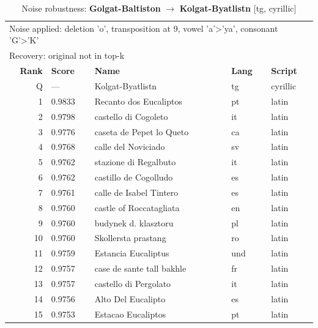 \begin{table}[htbp]
\centering
\small
\caption{Noise robustness: \textbf{Golgat-Baltiston} $\rightarrow$ \textbf{Kolgat-Byatlistn} [tg, cyrillic]}
\label{tab:noise-17}
\begin{tabular}{rllll}
\toprule
\multicolumn{5}{l}{\small Noise applied: deletion 'o', transposition at 9, vowel 'a'>'ya', consonant 'G'>'K'} \\
\multicolumn{5}{l}{\small Recovery: original not in top-k} \\
\midrule
\textbf{Rank} & \textbf{Score} & \textbf{Name} & \textbf{Lang} & \textbf{Script} \\
\midrule
\rowcolor{gray!20} Q & --- & Kolgat-Byatlistn & tg & cyrillic \\
\midrule
1 & 0.9833 & Recanto dos Eucaliptos & pt & latin \\
2 & 0.9798 & castello di Cogoleto & it & latin \\
3 & 0.9776 & caseta de Pepet lo Queto & ca & latin \\
4 & 0.9768 & calle del Noviciado & sv & latin \\
5 & 0.9762 & stazione di Regalbuto & it & latin \\
6 & 0.9762 & castillo de Cogolludo & es & latin \\
7 & 0.9761 & calle de Isabel Tintero & es & latin \\
8 & 0.9760 & castle of Roccatagliata & en & latin \\
9 & 0.9760 & budynek d. klasztoru & pl & latin \\
10 & 0.9760 & Skollersta prastang & ro & latin \\
11 & 0.9759 & Estancia Eucaliptus & und & latin \\
12 & 0.9757 & case de sante tall bakhle & fr & latin \\
13 & 0.9757 & castello di Pergolato & it & latin \\
14 & 0.9756 & Alto Del Eucalipto & es & latin \\
15 & 0.9753 & Estacao Eucaliptos & pt & latin \\
\bottomrule
\end{tabular}
\end{table}

